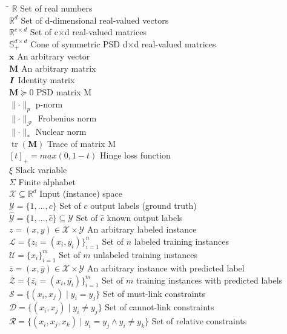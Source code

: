 \documentclass[12pt,a4paper]{report}
\DeclareMathOperator{\tr}{tr}
\begin{document}
\begin{tabbing}
\hspace{200pt}\=\kill
$\mathbb{R}$ \> Set of real numbers \\
$\mathbb{R}^d$ \> Set of d-dimensional real-valued vectors \\
$\mathbb{R}^{c \times d}$ \> Set of c$\times$d real-valued matrices \\
$\mathbb{S}^{d \times d}_+$ \> Cone of symmetric PSD d$\times$d real-valued matrices \\
$\textbf{x}$ \> An arbitrary vector \\
$\bm{M}$ \> An arbitrary matrix \\
$\textbf{\textit{I}}$ \> Identity matrix \\
$\bm{M} \succeq 0$ \> PSD matrix M \\
$\parallel \cdot \parallel_p$ \> p-norm \\
$\parallel \cdot \parallel_\mathcal{F}$ \> Frobenius norm \\
$\parallel \cdot \parallel_*$ \> Nuclear norm \\
$\tr(\bm{M})$ \> Trace of matrix M \\
$[t]_+ = max(0, 1-t)$ \> Hinge loss function \\
$\xi$ \> Slack variable \\
$\Sigma$ \> Finite alphabet \\

$\mathcal{X} \subseteq \mathbb{R}^d$ \> Input (instance) space \\
$\mathcal{Y} = \{ 1, \ldots ,c \}$ \> Set of $c$ output labels (ground truth) \\
$\widehat{\mathcal{Y}} = \{ 1, \ldots ,\widehat{c} \} \subseteq \mathcal{Y}$ \> Set of $\widehat{c}$ known output labels \\
$z=(x,y) \in \mathcal{X} \times \mathcal{Y}$ \> An arbitrary labeled instance \\
$\mathcal{L}=\{z_i=(x_i, y_i)\}^n_{i=1}$ \> Set of $n$ labeled training instances \\
$\mathcal{U} = \{x_i \}^m_{i=1}$ \> Set of $m$ unlabeled training instances \\
$\overline{z} = (x, \overline{y}) \in \mathcal{X} \times \widehat{\mathcal{Y}} $ \> An arbitrary instance with predicted label \\
$\overline{\mathcal{Z}} = \{\overline{z_i} = (x_i, \overline{y_i}) \}^m_{i=1}$ \> Set of $m$ training instances with predicted labels \\
$\mathcal{S} = \{ (x_i, x_j) \mid y_i = y_j \}$ \> Set of must-link constraints \\
$\mathcal{D} = \{ (x_i, x_j) \mid y_i \neq y_j \}$ \> Set of cannot-link constraints \\
$\mathcal{R} = \{ (x_i, x_j, x_k) \mid y_i = y_j \wedge y_i \neq y_k \}$ \> Set of relative constraints \\
\end{tabbing} 
\end{document}
